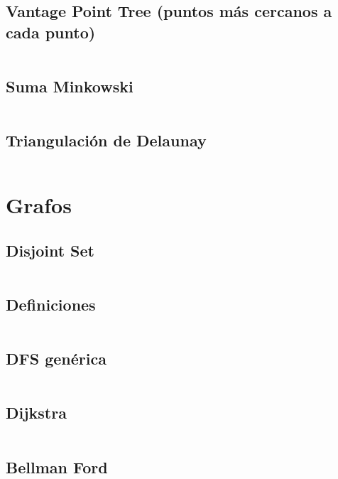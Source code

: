 \documentclass[11pt]{article}
\begin{document}
		\subsection{Vantage Point Tree (puntos más cercanos a cada punto)}
		\inputminted[tabsize=2,breaklines,firstline=276,lastline=339,fontsize=\small]{c++}{geometry.cpp}
		
		\subsection{Suma Minkowski}
		\inputminted[tabsize=2,breaklines,firstline=503,lastline=524,fontsize=\small]{c++}{geometry.cpp}
		
		\subsection{Triangulación de Delaunay}
		\inputminted[tabsize=2,breaklines,firstline=588,lastline=754,fontsize=\small]{c++}{geometry.cpp}
		
	\newpage
	\section{Grafos}
		\subsection{Disjoint Set}
		\inputminted[tabsize=2,breaklines,firstline=8,lastline=37,fontsize=\small]{c++}{graph.cpp}
		
		\subsection{Definiciones}
		\inputminted[tabsize=2,breaklines,firstline=39,lastline=100,fontsize=\small]{c++}{graph.cpp}
		
		\subsection{DFS genérica}
		\inputminted[tabsize=2,breaklines,firstline=411,lastline=429,fontsize=\small]{c++}{graph.cpp}
		
		\subsection{Dijkstra}
		\inputminted[tabsize=2,breaklines,firstline=102,lastline=125,fontsize=\small]{c++}{graph.cpp}
		
		\subsection{Bellman Ford}
		\inputminted[tabsize=2,breaklines,firstline=127,lastline=161,fontsize=\small]{c++}{graph.cpp}
		
\end{document}
